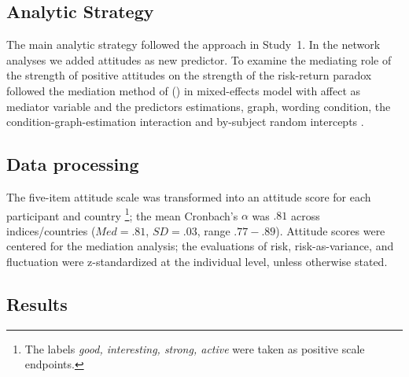 \documentclass[a4paper,man, natbib,floatsintext]{apa6} %
\begin{document}
\subsection{Analytic Strategy}
The main analytic strategy followed the approach in Study~1. In the network analyses we added attitudes as new predictor. To examine the mediating role of the strength of positive attitudes on the strength of the risk-return paradox followed the mediation method of \citeauthor{Imai2010} (\citeyear{Imai2010}) in mixed-effects model with affect as mediator variable and the predictors estimations, graph, wording condition, the condition-graph-estimation interaction and by-subject random intercepts \citep[using the R package mediation v4.4.7,][]{tingeley2014}.

\subsection{Data processing}
The five-item attitude scale was transformed into an attitude score for each participant and country \citep{Kempf2014a}\footnote{The labels \textit{good, interesting, strong, active} were taken as positive scale endpoints.}; the mean Cronbach's $\alpha$ was $.81$ across indices/countries ($Med=.81$, $SD=.03$, range $.77-.89$). Attitude scores were centered for the mediation analysis; the evaluations of risk, risk-as-variance, and fluctuation were z-standardized at the individual level, unless otherwise stated.

\subsection{Results}
\end{document}
